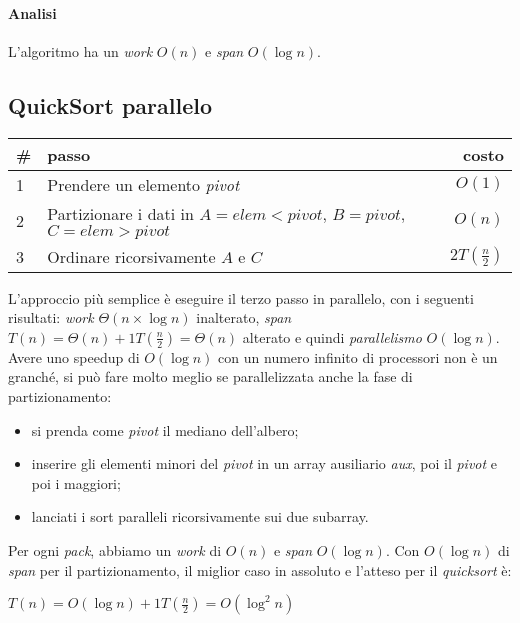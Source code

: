 \paragraph{Analisi}
L'algoritmo ha un \textit{work} $O(n)$ e \textit{span} $O(\log{n})$.

\subsection{QuickSort parallelo}
\begin{center}
	\begin{tabular}{| l | l | r |}
		\hline
		\textbf{\#} & \textbf{passo} & \textbf{costo} \\ \hline
		1 & Prendere un elemento \textit{pivot} & $O(1)$ \\
		2 & Partizionare i dati in $A = elem < pivot$, $B = pivot$, $C = elem > pivot$ & $O(n)$ \\
		3 & Ordinare ricorsivamente $A$ e $C$ & $2T(\frac{n}{2})$ \\
		\hline
	\end{tabular}
\end{center}
L'approccio più semplice è eseguire il terzo passo in parallelo, con i seguenti risultati: \textit{work} $\Theta(n\times \log{n})$ inalterato, \textit{span} $T(n) = \Theta(n) + 1T(\frac{n}{2}) = \Theta(n)$ alterato e quindi \textit{parallelismo} $O(\log{n})$. \\
Avere uno speedup di $O(\log{n})$ con un numero infinito di processori non è un granché, si può fare molto meglio se parallelizzata anche la fase di partizionamento:
\begin{itemize}
	\item si prenda come \textit{pivot} il mediano dell'albero;
	\item inserire gli elementi minori del \textit{pivot} in un array ausiliario \textit{aux}, poi il \textit{pivot} e poi i maggiori;
	\item lanciati i sort paralleli ricorsivamente sui due subarray.
\end{itemize}
Per ogni \textit{pack}, abbiamo un \textit{work} di $O(n)$ e \textit{span} $O(\log{n})$. Con $O(\log{n})$ di \textit{span} per il partizionamento, il miglior caso in assoluto e l'atteso per il \textit{quicksort} è:
\begin{center}
	$T(n) = O(\log{n}) + 1T(\frac{n}{2}) = O(\log^{2}{n})$
\end{center}

